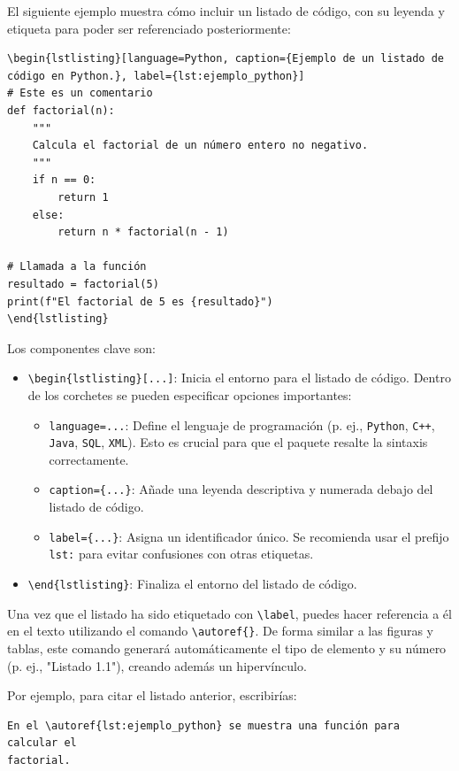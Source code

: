 \documentclass[11pt,a4paper]{book}
\begin{document}
El siguiente ejemplo muestra cómo incluir un listado de código, con su leyenda y etiqueta para poder ser referenciado posteriormente:

\begin{verbatim}
\begin{lstlisting}[language=Python, caption={Ejemplo de un listado de código en Python.}, label={lst:ejemplo_python}]
# Este es un comentario
def factorial(n):
    """
    Calcula el factorial de un número entero no negativo.
    """
    if n == 0:
        return 1
    else:
        return n * factorial(n - 1)

# Llamada a la función
resultado = factorial(5)
print(f"El factorial de 5 es {resultado}")
\end{lstlisting}
\end{verbatim}

Los componentes clave son:
\begin{itemize}
    \item \verb|\begin{lstlisting}[...]|: Inicia el entorno para el listado de código. Dentro de los corchetes se pueden especificar opciones importantes:
    \begin{itemize}
        \item \verb|language=...|: Define el lenguaje de programación (p. ej., \texttt{Python}, \texttt{C++}, \texttt{Java}, \texttt{SQL}, \texttt{XML}). Esto es crucial para que el paquete resalte la sintaxis correctamente.
        \item \verb|caption={...}|: Añade una leyenda descriptiva y numerada debajo del listado de código.
        \item \verb|label={...}|: Asigna un identificador único. Se recomienda usar el prefijo \texttt{lst:} para evitar confusiones con otras etiquetas.
    \end{itemize}
    \item \verb|\end{lstlisting}|: Finaliza el entorno del listado de código.
\end{itemize}

Una vez que el listado ha sido etiquetado con \verb|\label|, puedes hacer referencia a él en el texto utilizando el comando \verb|\autoref{}|. De forma similar a las figuras y tablas, este comando generará automáticamente el tipo de elemento y su número (p. ej., "Listado 1.1"), creando además un hipervínculo.

Por ejemplo, para citar el listado anterior, escribirías:
\begin{verbatim}
En el \autoref{lst:ejemplo_python} se muestra una función para calcular el 
factorial.
\end{verbatim}
\end{document}
